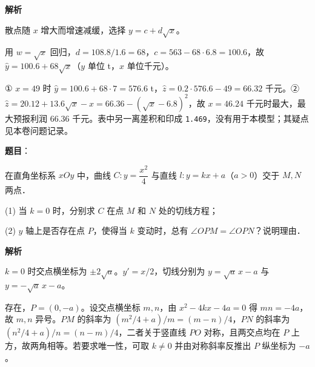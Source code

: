 \begin{answer}
\textbf{解析}


散点随 $x$ 增大而增速减缓，选择 $y=c+d\sqrt x$。


用 $w=\sqrt x$ 回归，$d=108.8/1.6=68$，$c=563-68\cdot6.8=100.6$，故 $\widehat y=100.6+68\sqrt x$（$y$ 单位 t，$x$ 单位千元）。


① $x=49$ 时 $\widehat y=100.6+68\cdot7=576.6$ t，$\widehat z=0.2\cdot576.6-49=66.32$ 千元。② $\widehat z=20.12+13.6\sqrt x-x=66.36-(\sqrt x-6.8)^2$，故 $x=46.24$ 千元时最大，最大预报利润 $66.36$ 千元。表中另一离差积和印成 \texttt{1.469}，没有用于本模型；其疑点见本卷问题记录。




\end{answer}
\begin{answer}

\textbf{题目}：

在直角坐标系 $xOy$ 中，曲线 $C:y=\dfrac{x^2}{4}$ 与直线 $l:y=kx+a$（$a>0$）交于 $M,N$ 两点．

(1) 当 $k=0$ 时，分别求 $C$ 在点 $M$ 和 $N$ 处的切线方程；

(2) $y$ 轴上是否存在点 $P$，使得当 $k$ 变动时，总有 $\angle OPM=\angle OPN$？说明理由．

\textbf{解析}


$k=0$ 时交点横坐标为 $\pm2\sqrt a$。$y'=x/2$，切线分别为 $y=\sqrt a\,x-a$ 与 $y=-\sqrt a\,x-a$。


存在，$P=(0,-a)$。设交点横坐标 $m,n$，由 $x^2-4kx-4a=0$ 得 $mn=-4a$，故 $m,n$ 异号。$PM$ 的斜率为 $(m^2/4+a)/m=(m-n)/4$，$PN$ 的斜率为 $(n^2/4+a)/n=(n-m)/4$，二者关于竖直线 $PO$ 对称，且两交点均在 $P$ 上方，故两角相等。若要求唯一性，可取 $k\ne0$ 并由对称斜率反推出 $P$ 纵坐标为 $-a$。



\end{answer}
